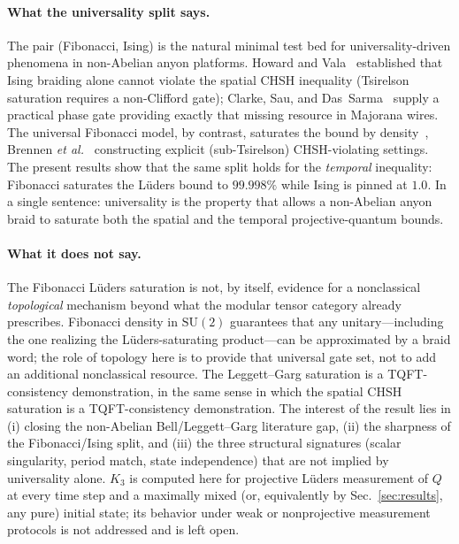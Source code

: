 \documentclass[aps,prx,reprint,amsmath,amssymb,floatfix,nofootinbib,superscriptaddress]{revtex4-2}
\begin{document}
\paragraph{What the universality split says.}
The pair (Fibonacci, Ising) is the natural minimal test bed for
universality-driven phenomena in non-Abelian anyon platforms.
Howard and Vala~\cite{HowardVala2012} established that Ising braiding
alone cannot violate the spatial CHSH inequality (Tsirelson
saturation requires a non-Clifford gate); Clarke, Sau, and
Das~Sarma~\cite{ClarkeSauDasSarma2016} supply a practical phase gate
providing exactly that missing resource in Majorana wires. The
universal Fibonacci model, by contrast, saturates the bound by
density~\cite{NayakSimonStern2008}, Brennen \emph{et al.}~\cite{Brennen2009}
constructing explicit (sub-Tsirelson) CHSH-violating settings. The present results
show that the same split holds for the \emph{temporal} inequality:
Fibonacci saturates the L\"uders bound to $99.998\%$ while Ising is
pinned at $1.0$. In a single sentence: universality is the property
that allows a non-Abelian anyon braid to saturate both the spatial
and the temporal projective-quantum bounds.

\paragraph{What it does not say.}
The Fibonacci L\"uders saturation is not, by itself, evidence for a
nonclassical \emph{topological} mechanism beyond what the modular
tensor category already prescribes. Fibonacci density in
$\mathrm{SU}(2)$ guarantees that any unitary---including the one
realizing the L\"uders-saturating product---can be approximated by a
braid word; the role of topology here is to provide that universal
gate set, not to add an additional nonclassical resource. The
Leggett--Garg saturation is a TQFT-consistency demonstration, in the
same sense in which the spatial CHSH saturation is a TQFT-consistency
demonstration. The interest of the result lies in (i) closing the
non-Abelian Bell/Leggett--Garg literature gap, (ii) the sharpness of
the Fibonacci/Ising split, and (iii) the three structural signatures
(scalar singularity, period match, state independence) that are not
implied by universality alone. $K_{3}$ is computed here for
projective L\"uders measurement of $Q$ at every time step and a
maximally mixed (or, equivalently by Sec.~\ref{sec:results}, any
pure) initial state; its behavior under weak or nonprojective
measurement protocols is not addressed and is left open.
\end{document}
